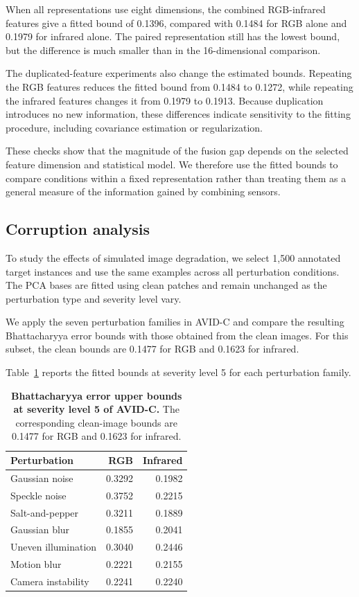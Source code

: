 \documentclass[10pt]{article}
\newcommand{\corrupt}{\textsc{AVID-C}}
\begin{document}
When all representations use eight dimensions, the combined RGB-infrared features give a fitted bound of 0.1396, compared with 0.1484 for RGB alone and 0.1979 for infrared alone. The paired representation still has the lowest bound, but the difference is much smaller than in the 16-dimensional comparison.

The duplicated-feature experiments also change the estimated bounds. Repeating the RGB features reduces the fitted bound from 0.1484 to 0.1272, while repeating the infrared features changes it from 0.1979 to 0.1913. Because duplication introduces no new information, these differences indicate sensitivity to the fitting procedure, including covariance estimation or regularization.

These checks show that the magnitude of the fusion gap depends on the selected feature dimension and statistical model. We therefore use the fitted bounds to compare conditions within a fixed representation rather than treating them as a general measure of the information gained by combining sensors.

\subsection{Corruption analysis}

To study the effects of simulated image degradation, we select 1,500 annotated target instances and use the same examples across all perturbation conditions. The PCA bases are fitted using clean patches and remain unchanged as the perturbation type and severity level vary.

We apply the seven perturbation families in \corrupt{} and compare the resulting Bhattacharyya error bounds with those obtained from the clean images. For this subset, the clean bounds are 0.1477 for RGB and 0.1623 for infrared.

Table~\ref{tab:severityfive} reports the fitted bounds at severity level 5 for each perturbation family.

\begin{table}[h]
\centering
\caption{\textbf{Bhattacharyya error upper bounds at severity level 5 of \corrupt{}.}
The corresponding clean-image bounds are 0.1477 for RGB and 0.1623 for infrared.}
\label{tab:severityfive}
\small
\begin{tabular}{lrr}
\toprule
Perturbation & RGB & Infrared \\
\midrule
Gaussian noise & 0.3292 & 0.1982 \\
Speckle noise & 0.3752 & 0.2215 \\
Salt-and-pepper & 0.3211 & 0.1889 \\
Gaussian blur & 0.1855 & 0.2041 \\
Uneven illumination & 0.3040 & 0.2446 \\
Motion blur & 0.2221 & 0.2155 \\
Camera instability & 0.2241 & 0.2240 \\
\bottomrule
\end{tabular}
\end{table}
\end{document}
